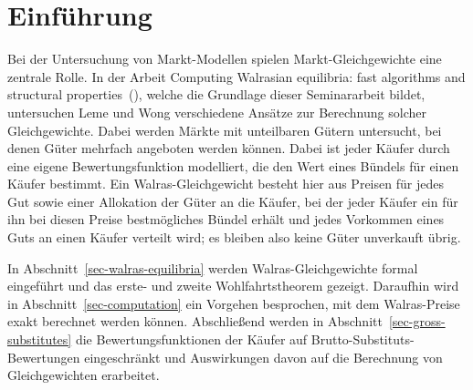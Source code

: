 \section{Einführung}

Bei der Untersuchung von Markt-Modellen spielen Markt-Gleichgewichte eine zentrale Rolle.
In der Arbeit \glqq Computing Walrasian equilibria: fast algorithms and structural properties\grqq\ (\cite{PaesLeme2018}), welche die Grundlage dieser Seminararbeit bildet, untersuchen Leme und Wong verschiedene Ansätze zur Berechnung solcher Gleichgewichte.
Dabei werden Märkte mit unteilbaren Gütern untersucht, bei denen Güter mehrfach angeboten werden können.
Dabei ist jeder Käufer durch eine eigene Bewertungsfunktion modelliert, die den Wert eines Bündels für einen Käufer bestimmt.
Ein Walras-Gleichgewicht besteht hier aus Preisen für jedes Gut sowie einer Allokation der Güter an die Käufer, bei der jeder Käufer ein für ihn bei diesen Preise bestmögliches Bündel erhält und jedes Vorkommen eines Guts an einen Käufer verteilt wird; es bleiben also keine Güter unverkauft übrig.

In Abschnitt~\ref{sec-walras-equilibria} werden Walras-Gleichgewichte formal eingeführt und das erste- und zweite Wohlfahrtstheorem gezeigt.
Daraufhin wird in Abschnitt~\ref{sec-computation} ein Vorgehen besprochen, mit dem Walras-Preise exakt berechnet werden können.
Abschließend werden in Abschnitt~\ref{sec-gross-substitutes} die Bewertungsfunktionen der Käufer auf Brutto-Substituts-Bewertungen eingeschränkt und Auswirkungen davon auf die Berechnung von Gleichgewichten erarbeitet.